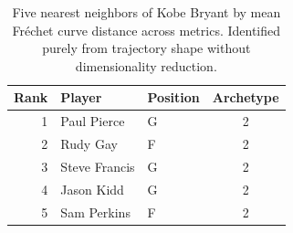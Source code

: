 \begin{table}[htbp]
  \centering\small
  \begin{tabular}{rllc}
    \toprule
    Rank & Player & Position & Archetype \\
    \midrule
    1 & Paul Pierce & G & 2 \\
    2 & Rudy Gay & F & 2 \\
    3 & Steve Francis & G & 2 \\
    4 & Jason Kidd & G & 2 \\
    5 & Sam Perkins & F & 2 \\
    \bottomrule
  \end{tabular}
  \caption{Five nearest neighbors of Kobe Bryant by mean Fr\'{e}chet curve distance across metrics. Identified purely from trajectory shape without dimensionality reduction.}
  \label{tab:Kobe_Bryant_frechet_curve_neighbors}
\end{table}

